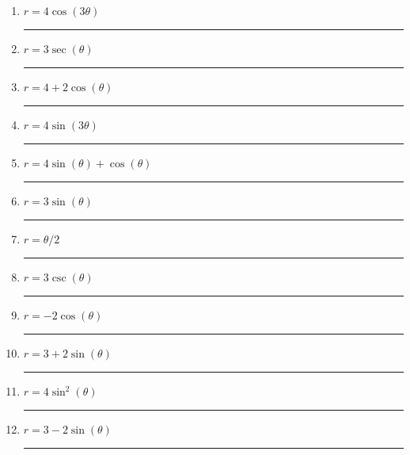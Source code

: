 \documentclass[11pt]{exam}
\begin{document}
\newcommand\aline[1]{\rule{0.5in}{0.2pt} }

\vspace{2ex}
\begin{multicols}{3}
	\begin{enumerate}
		\item $r=4\cos(3\theta)$ \aline{G}
		\item $r = 3\sec(\theta)$ \aline{J}
		\item $r=4+2\cos(\theta)$ \aline{E}
		\item $r=4\sin(3\theta)$ \aline{F}
		\item $r=4\sin(\theta)+\cos(\theta)$ \aline{H}
		\item $r = 3\sin(\theta)$ \aline{A}
		\item $r = \theta/2$ \aline{K}
		\item $r = 3\csc(\theta)$ \aline{L}
		\item $r = -2 \cos(\theta)$ \aline{B}
		\item $r = 3+2\sin(\theta)$ \aline{C}
		\item $r=4\sin^2(\theta)$ \aline{I}
		\item $r = 3-2\sin(\theta)$ \aline{D}
	\end{enumerate}
	\end{multicols}
\clearpage
\end{document}
